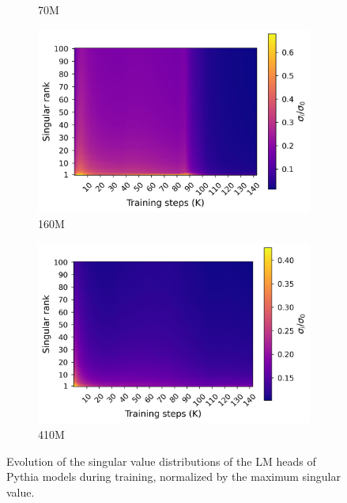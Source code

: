 \begin{figure}[h]
\begin{subfigure}{0.32\columnwidth}
         \caption{70M}
         \label{fig:sv_70M}
    \end{subfigure}
    \begin{subfigure}{0.32\columnwidth}
         \includegraphics[width=\linewidth]{sources/part_1/softmax_bottleneck/imgs/sv_map_160m.png}
         \caption{160M}
         \label{fig:sv_160M}
    \end{subfigure}
    \begin{subfigure}{0.32\columnwidth}
         \includegraphics[width=\linewidth]{sources/part_1/softmax_bottleneck/imgs/sv_map_410m.png}
         \caption{410M}
         \label{fig:sv_410M}
    \end{subfigure}
    \caption{Evolution of the singular value distributions of the LM heads of Pythia models during training, normalized by the maximum singular value.}
    \label{fig:sv_evolve}
\end{figure}

